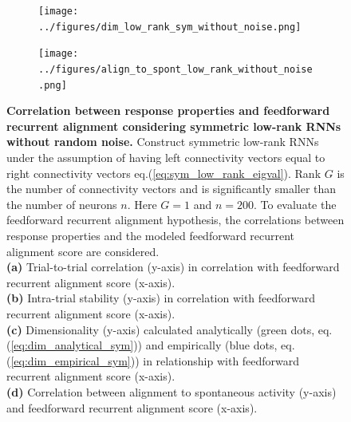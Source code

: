 \documentclass[11pt]{article}
\begin{document}
\begin{figure}[H]
\begin{subfigure}[b]{0.45\textwidth}
			\end{subfigure}
			\newline
			\begin{subfigure}[b]{0.45\textwidth}
				\texttt{[image: ../figures/dim\_low\_rank\_sym\_without\_noise.png]}
				\caption{}
			\end{subfigure}
			\hfill
			\begin{subfigure}[b]{0.45\textwidth}
				\texttt{[image: ../figures/align\_to\_spont\_low\_rank\_without\_noise.png]}
				\caption{}
			\end{subfigure}
			\caption{\textbf{Correlation between response properties and feedforward recurrent alignment considering symmetric low-rank RNNs without random noise.} Construct symmetric low-rank RNNs under the assumption of having left connectivity vectors equal to right connectivity vectors eq.(\ref{eq:sym_low_rank_eigval}). Rank $G$ is the number of connectivity vectors and is significantly smaller than the number of neurons $n$. Here $G = 1$ and $n = 200$. To evaluate the feedforward recurrent alignment hypothesis, the correlations between response properties and the modeled feedforward recurrent alignment score are considered. \\
			\textbf{(a)} Trial-to-trial correlation (y-axis) in correlation with feedforward recurrent alignment score (x-axis).\\
			\textbf{(b)} Intra-trial stability (y-axis) in correlation with feedforward recurrent alignment score (x-axis).\\
			\textbf{(c)} Dimensionality (y-axis) calculated analytically (green dots, eq.(\ref{eq:dim_analytical_sym})) and empirically (blue dots, eq.(\ref{eq:dim_empirical_sym})) in relationship with feedforward recurrent alignment score (x-axis).\\
			\textbf{(d)} Correlation between alignment to spontaneous activity (y-axis) and feedforward recurrent alignment score (x-axis).}
		
			\label{fig:ttc_its_low_rank_sym_no_noise}
		\end{figure}
	
\end{document}
